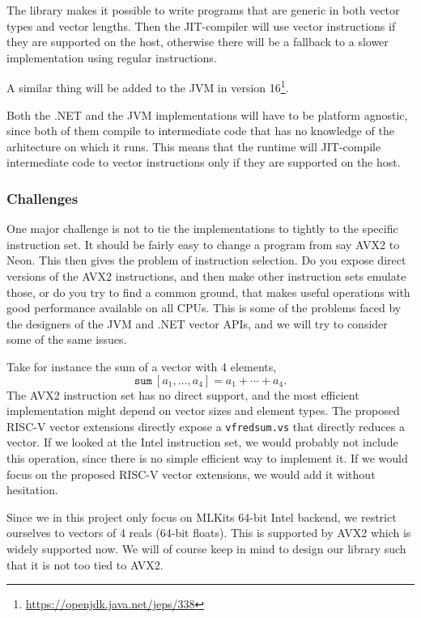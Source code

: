 \documentclass{article}
\begin{document}
The library makes it possible to write programs that are generic in both vector types and vector lengths. Then the JIT-compiler will use vector instructions if they are supported on the host, otherwise there will be a fallback to a slower implementation using regular instructions.

A similar thing will be added to the JVM in version 16\footnote{\url{https://openjdk.java.net/jeps/338}}.

Both the .NET and the JVM implementations will have to be platform agnostic, since both of them compile to intermediate code that has no knowledge of the arhitecture on which it runs. This means that the runtime will JIT-compile intermediate code to vector instructions only if they are supported on the host.

\subsubsection{Challenges}

One major challenge is not to tie the implementations to tightly to the specific instruction set. It should be fairly easy to change a program from say AVX2 to Neon. This then gives the problem of instruction selection. Do you expose direct versions of the AVX2 instructions, and then make other instruction sets emulate those, or do you try to find a common ground, that makes useful operations with good performance available on all CPUs. This is some of the problems faced by the designers of the JVM and .NET vector APIs, and we will try to consider some of the same issues.

Take for instance the sum of a vector with 4 elements,
\[
    \mathtt{sum}\ [a_1, \ldots, a_4] = a_1 + \cdots + a_4.
\]
The AVX2 instruction set has no direct support, and the most efficient implementation might depend on vector sizes and element types. The proposed RISC-V vector extensions directly expose a \texttt{vfredsum.vs} that directly reduces a vector. If we looked at the Intel instruction set, we would probably not include this operation, since there is no simple efficient way to implement it. If we would focus on the proposed RISC-V vector extensions, we would add it without hesitation.

Since we in this project only focus on MLKits 64-bit Intel backend, we restrict ourselves to vectors of 4 reals (64-bit floats). This is supported by AVX2 which is widely supported now. We will of course keep in mind to design our library such that it is not too tied to AVX2.
\end{document}
